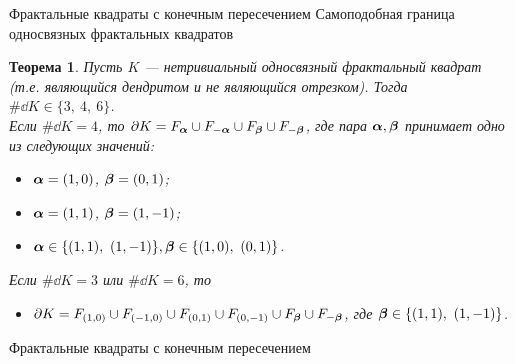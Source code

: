\documentclass[aspectratio=1610, 10pt, notheorems]{beamer}
\newtheorem{theorem}     {Теорема}
\begin{document}
\begin{frame}{Фрактальные квадраты с конечным пересечением} {Самоподобная граница односвязных фрактальных квадратов}
\begin{theorem}\label{ssboundary}
Пусть $K$ --- нетривиальный односвязный фрактальный квадрат (т.е. являющийся дендритом и не являющийся отрезком).
Тогда $\#\dd K\in\{3,\ 4,\ 6\}$. \\
Если $\#\dd K=4$, то  $\partial K=F_{\bm{\alpha}}\cup F_{-{\bm{\alpha}}}\cup F_{\bm{\beta}}\cup F_{-{\bm{\beta}}}$, где   пара  ${\bm{\alpha}},{\bm{\beta}}$ принимает одно из следующих значений:
	\begin{itemize}%
	\item[{\bf A.}] ${\bm{\alpha}}=(1,0)$, $ {\bm{\beta}}=(0,1)$;
	\item[{\bf B.}] ${\bm{\alpha}}=(1,1)$, $ {\bm{\beta}}=(1,-1)$;
	\item[{\bf C.}] $\bma\in\{(1,1),\ (1,-1)\},\bmb\in\{(1,0),\ (0,1)\}$.
	\end{itemize}
 Если $\#\dd K=3$ или $\#\dd K=6$, то
\begin{itemize}%
	\item[{\bf D.}] $\partial K=F_{(1,0)}\cup F_{(-1,0)}\cup F_{(0,1)}\cup F_{(0,-1)}\cup F_{\bm{\beta}}\cup F_{-{\bm{\beta}}}$, где ${\bm{\beta}}\in\{(1,1),\ (1,-1)\}$.
	\end{itemize}
\end{theorem}
\end{frame}


\begin{frame}{Фрактальные квадраты с конечным пересечением}{
}
\begin{center}
\end{center}
\end{frame}
\end{document}
